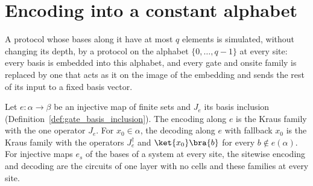 \section{Encoding into a constant alphabet}
\label{sec:protocols_encoding}

A protocol whose bases along it have at most $q$ elements is simulated, without changing its
depth, by a protocol on the alphabet $\{0,\dots,q-1\}$ at every site: every basis is embedded
into this alphabet, and every gate and onsite family is replaced by one that acts as it on the
image of the embedding and sends the rest of its input to a fixed basis vector.

\begin{definition}
    \label{def:protocols_encoding}
    \leanok
    Let $e:\alpha\to\beta$ be an injective map of finite sets and $J_e$ its basis inclusion
    (Definition~\ref{def:gate_basis_inclusion}). The encoding along $e$ is the Kraus family with the one
    operator $J_e$. For $x_0\in\alpha$, the decoding along $e$ with fallback $x_0$ is the Kraus
    family with the operators $J_e^\dagger$ and $\ket{x_0}\bra{b}$ for every $b\notin e(\alpha)$.
    For injective maps $e_s$ of the bases of a system at every site, the sitewise encoding and
    decoding are the circuits of one layer with no cells and these families at every site.
\end{definition}

